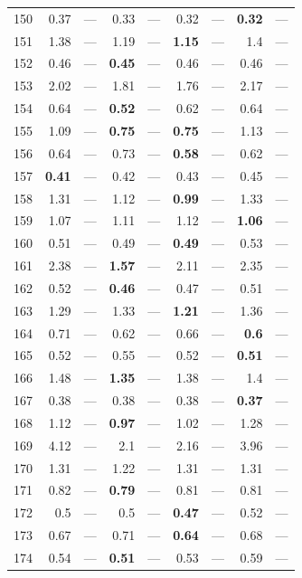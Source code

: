\begin{longtable}{lr@{\hskip 4pt}l@{\hskip 12pt}r@{\hskip 4pt}l@{\hskip 12pt}r@{\hskip 4pt}l@{\hskip 12pt}r@{\hskip 4pt}l@{\hskip 12pt}}
150 & 0.37 & --- & 0.33 & --- & 0.32 & --- & \textbf{0.32} & --- \\
151 & 1.38 & --- & 1.19 & --- & \textbf{1.15} & --- & 1.4 & --- \\
152 & 0.46 & --- & \textbf{0.45} & --- & 0.46 & --- & 0.46 & --- \\
153 & 2.02 & --- & 1.81 & --- & 1.76 & --- & 2.17 & --- \\
154 & 0.64 & --- & \textbf{0.52} & --- & 0.62 & --- & 0.64 & --- \\
155 & 1.09 & --- & \textbf{0.75} & --- & \textbf{0.75} & --- & 1.13 & --- \\
156 & 0.64 & --- & 0.73 & --- & \textbf{0.58} & --- & 0.62 & --- \\
157 & \textbf{0.41} & --- & 0.42 & --- & 0.43 & --- & 0.45 & --- \\
158 & 1.31 & --- & 1.12 & --- & \textbf{0.99} & --- & 1.33 & --- \\
159 & 1.07 & --- & 1.11 & --- & 1.12 & --- & \textbf{1.06} & --- \\
160 & 0.51 & --- & 0.49 & --- & \textbf{0.49} & --- & 0.53 & --- \\
161 & 2.38 & --- & \textbf{1.57} & --- & 2.11 & --- & 2.35 & --- \\
162 & 0.52 & --- & \textbf{0.46} & --- & 0.47 & --- & 0.51 & --- \\
163 & 1.29 & --- & 1.33 & --- & \textbf{1.21} & --- & 1.36 & --- \\
164 & 0.71 & --- & 0.62 & --- & 0.66 & --- & \textbf{0.6} & --- \\
165 & 0.52 & --- & 0.55 & --- & 0.52 & --- & \textbf{0.51} & --- \\
166 & 1.48 & --- & \textbf{1.35} & --- & 1.38 & --- & 1.4 & --- \\
167 & 0.38 & --- & 0.38 & --- & 0.38 & --- & \textbf{0.37} & --- \\
168 & 1.12 & --- & \textbf{0.97} & --- & 1.02 & --- & 1.28 & --- \\
169 & 4.12 & --- & 2.1 & --- & 2.16 & --- & 3.96 & --- \\
170 & 1.31 & --- & 1.22 & --- & 1.31 & --- & 1.31 & --- \\
171 & 0.82 & --- & \textbf{0.79} & --- & 0.81 & --- & 0.81 & --- \\
172 & 0.5 & --- & 0.5 & --- & \textbf{0.47} & --- & 0.52 & --- \\
173 & 0.67 & --- & 0.71 & --- & \textbf{0.64} & --- & 0.68 & --- \\
174 & 0.54 & --- & \textbf{0.51} & --- & 0.53 & --- & 0.59 & --- \\

\end{longtable}
